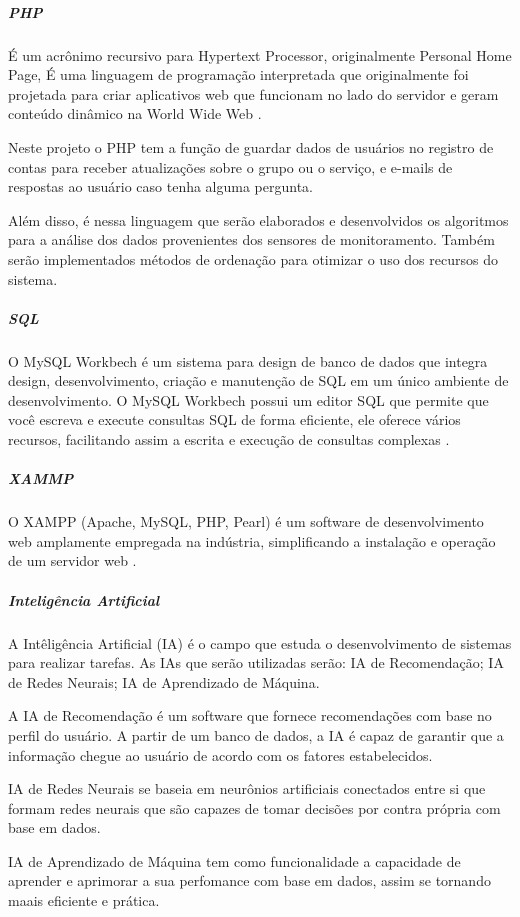 \subparagraph*{\textbf{PHP}}

É um acrônimo recursivo para Hypertext Processor, originalmente Personal Home Page, É uma linguagem de programação interpretada que originalmente foi projetada para criar aplicativos web que funcionam no lado do servidor e geram conteúdo dinâmico na World Wide Web \cite{php2024} . 

Neste projeto o PHP tem a função de guardar dados de usuários no registro de contas para receber atualizações sobre o grupo ou o serviço, e e-mails de respostas ao usuário caso tenha alguma pergunta. 

Além disso, é nessa linguagem que serão elaborados e desenvolvidos os algoritmos para a análise dos dados provenientes dos sensores de monitoramento. Também serão implementados métodos de ordenação para otimizar o uso dos recursos do sistema. 

\subparagraph*{\textbf{SQL}}
  
O MySQL Workbech é um sistema para design de banco de dados que integra design, desenvolvimento, criação e manutenção de SQL em um único ambiente de desenvolvimento. O MySQL Workbech possui um editor SQL que permite que você escreva e execute consultas SQL de forma eficiente, ele oferece vários recursos, facilitando assim a escrita e execução de consultas complexas \cite{andrade2020}. 

\subparagraph*{\textbf{XAMMP}}

O XAMPP (Apache, MySQL, PHP, Pearl) é um software de desenvolvimento web amplamente empregada na indústria, simplificando a instalação e operação de um servidor web \cite{methaseo2023}.

\subparagraph*{\textbf{Inteligência Artificial}}

A Intêligência Artificial (IA) é o campo que estuda o desenvolvimento de sistemas para realizar tarefas. As IAs que serão utilizadas serão: IA de Recomendação; IA de Redes Neurais; IA de Aprendizado de Máquina.

A IA de Recomendação é um software que fornece recomendações com base no perfil do usuário. A partir de um banco de dados, a IA é capaz de garantir que a informação chegue ao usuário de acordo com os fatores estabelecidos.\cite{mensagem2023}

IA de Redes Neurais se baseia em neurônios artificiais conectados entre si que formam redes neurais que são capazes de tomar decisões por contra própria com base em dados.\cite{Aceleradora2023}

IA de Aprendizado de Máquina tem como funcionalidade a capacidade de aprender e aprimorar a sua perfomance com base em dados, assim se tornando maais eficiente e prática.\cite{Aceleradora2023}

